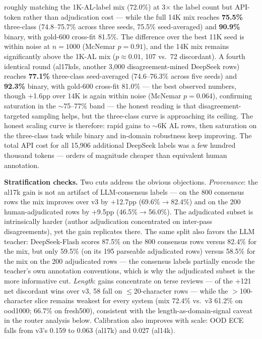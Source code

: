 \documentclass[11pt,a4paper]{article}
\begin{document}
roughly matching the 1K-AL-label mix (72.0\%) at 3$\times$
the label count but API-token rather than adjudication cost --- while
the full 14K mix reaches \textbf{75.5\%} three-class
(74.8--75.7\% across three seeds, 75.5\% seed-averaged)
and \textbf{90.9\%} binary, with
gold-600 cross-fit 81.5\%. The difference over the best 11K seed is
within noise at
$n{=}1000$ (McNemar $p = 0.91$), and the 14K mix remains significantly
above the 1K-AL mix ($p \approx 0.01$, 107 vs.\ 72 discordant). A
fourth identical round (al17kds, another 3{,}000 disagreement-mined
DeepSeek rows) reaches \textbf{77.1\%} three-class seed-averaged
(74.6--76.3\% across five seeds) and
\textbf{92.3\%} binary, with gold-600 cross-fit 81.0\% --- the best
observed numbers, though +1.6pp over 14K is again within noise
(McNemar $p = 0.064$), confirming saturation in the $\sim$75--77\% band ---
the
honest reading is that disagreement-targeted sampling helps, but the
three-class curve is approaching its ceiling. The honest scaling curve is
therefore: rapid gains to $\sim$6K AL rows, then saturation on the
three-class task while binary and in-domain robustness keep improving.
The total API cost for all 15{,}906 additional DeepSeek labels was a
few hundred thousand tokens --- orders of magnitude cheaper than
equivalent human annotation.

\textbf{Stratification checks.} Two cuts address the obvious
objections. \emph{Provenance}: the al17k gain is not an artifact of
LLM-consensus labels --- on the 800 consensus rows the mix improves
over v3 by +12.7pp (69.6\%$\to$82.4\%) and on the 200
human-adjudicated rows by +9.5pp (46.5\%$\to$56.0\%). The
adjudicated subset is intrinsically harder (author adjudication
concentrated on inter-pass disagreements), yet the gain replicates
there. The same split also favors the LLM teacher: DeepSeek-Flash
scores 87.5\% on the 800 consensus rows versus 82.4\% for the mix,
but only 59.5\% (on its 195 parseable adjudicated rows) versus
58.5\% for the mix on the 200 adjudicated rows --- the
consensus labels partially encode the teacher's own annotation
conventions, which is why the adjudicated subset is the more
informative cut. \emph{Length}: gains concentrate on terse reviews --- of the
+121 net discordant wins over v3, 58 fall on $\le$20-character rows
--- while the $>$100-character slice remains weakest for every system
(mix 72.4\% vs.\ v3 61.2\% on ood1000; 66.7\% on fresh500), consistent
with the length-as-domain-signal caveat in the router analysis below.
Calibration also improves with scale: OOD ECE falls from v3's 0.159
to 0.063 (al17k) and 0.027 (al14k).
\end{document}
